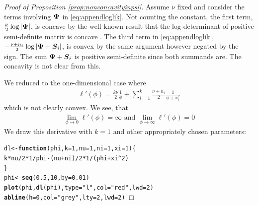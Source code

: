 \documentclass{article}\usepackage[]{graphicx}\usepackage[]{color}
\makeatletter
\newcommand{\hlnum}[1]{\textcolor[rgb]{0.686,0.059,0.569}{#1}}%
\newcommand{\hlstr}[1]{\textcolor[rgb]{0.192,0.494,0.8}{#1}}%
\newcommand{\hlopt}[1]{\textcolor[rgb]{0,0,0}{#1}}%
\newcommand{\hlstd}[1]{\textcolor[rgb]{0.345,0.345,0.345}{#1}}%
\newcommand{\hlkwa}[1]{\textcolor[rgb]{0.161,0.373,0.58}{\textbf{#1}}}%
\newcommand{\hlkwb}[1]{\textcolor[rgb]{0.69,0.353,0.396}{#1}}%
\newcommand{\hlkwc}[1]{\textcolor[rgb]{0.333,0.667,0.333}{#1}}%
\newcommand{\hlkwd}[1]{\textcolor[rgb]{0.737,0.353,0.396}{\textbf{#1}}}%
\newenvironment{kframe}{%
 \def\at@end@of@kframe{}%
 \ifinner\ifhmode%
  \def\at@end@of@kframe{\end{minipage}}%
  \begin{minipage}{\columnwidth}%
 \fi\fi%
 \def\FrameCommand##1{\hskip\@totalleftmargin \hskip-\fboxsep
 \colorbox{shadecolor}{##1}\hskip-\fboxsep
     \hskip-\linewidth \hskip-\@totalleftmargin \hskip\columnwidth}%
 \MakeFramed {\advance\hsize-\width
   \@totalleftmargin\z@ \linewidth\hsize
   \@setminipage}}%
 {\par\unskip\endMakeFramed%
 \at@end@of@kframe}
\newenvironment{knitrout}{}{} %
\makeatother
\begin{document}
\begin{proof}[Proof of Proposition \ref{prop:nonconcavityinpsi}]
Assume $\nu$ fixed and consider the terms involving ${\boldsymbol{\Psi}}$ in \eqref{eq:appendloglik}. Not counting the constant, the first term, $\frac{\nu}{2}  \log | {\boldsymbol{\Psi}} |$, is concave by the well known result that the log-determinant of positive semi-definite matrix is concave \citep[See e.g.][pp. 73-74]{Boyd2004}.
The third term in \eqref{eq:appendloglik}, $- \frac{\nu + n_i}{2}\log|{\boldsymbol{\Psi}} + {\boldsymbol{S}}_i|$, is convex by the same argument however negated by the sign.
The sum ${\boldsymbol{\Psi}} +{\boldsymbol{S}}_i$ is positive semi-definite since both summands are.
The concavity is not clear from this.

We reduced to the one-dimensional case where
\begin{align*}
  \ell'(\phi)
  = \frac{k\nu}{2}\frac{1}{\phi} +
      \sum_{i = 1}^k \frac{\nu + n_i}{2}\frac{1}{\phi + x_i^2}
\end{align*}
which is not clearly convex. We see, that
\begin{align*}
  \lim_{\phi \to 0} \ell'(\phi) = \infty
  \text{  and  }
  \lim_{\phi \to \infty} \ell'(\phi) = 0
\end{align*}
We draw this derivative with $k = 1$ and other appropriately chosen parameters:
\begin{knitrout}\footnotesize
{}\color{fgcolor}\begin{kframe}
\begin{alltt}
\hlstd{dl} \hlkwb{<-} \hlkwa{function}\hlstd{(}\hlkwc{phi}\hlstd{,} \hlkwc{k} \hlstd{=} \hlnum{1}\hlstd{,} \hlkwc{nu} \hlstd{=} \hlnum{1}\hlstd{,} \hlkwc{ni} \hlstd{=} \hlnum{1}\hlstd{,} \hlkwc{xi} \hlstd{=} \hlnum{1}\hlstd{)  \{}
  \hlstd{k}\hlopt{*}\hlstd{nu}\hlopt{/}\hlnum{2}\hlopt{*}\hlnum{1}\hlopt{/}\hlstd{phi} \hlopt{-} \hlstd{(nu} \hlopt{+} \hlstd{ni)}\hlopt{/}\hlnum{2} \hlopt{*} \hlnum{1}\hlopt{/}\hlstd{(phi} \hlopt{+} \hlstd{xi}\hlopt{^}\hlnum{2}\hlstd{)}
\hlstd{\}}
\hlstd{phi} \hlkwb{<-} \hlkwd{seq}\hlstd{(}\hlnum{0.5}\hlstd{,} \hlnum{10}\hlstd{,} \hlkwc{by} \hlstd{=} \hlnum{0.01}\hlstd{)}
\hlkwd{plot}\hlstd{(phi,} \hlkwd{dl}\hlstd{(phi),} \hlkwc{type} \hlstd{=} \hlstr{"l"}\hlstd{,} \hlkwc{col} \hlstd{=} \hlstr{"red"}\hlstd{,} \hlkwc{lwd} \hlstd{=} \hlnum{2}\hlstd{)}
\hlkwd{abline}\hlstd{(}\hlkwc{h} \hlstd{=} \hlnum{0}\hlstd{,} \hlkwc{col} \hlstd{=} \hlstr{"grey"}\hlstd{,} \hlkwc{lty} \hlstd{=} \hlnum{2}\hlstd{,} \hlkwc{lwd} \hlstd{=} \hlnum{2}\hlstd{)}
\end{alltt}
\end{kframe}

\end{knitrout}
\end{proof}
\end{document}
